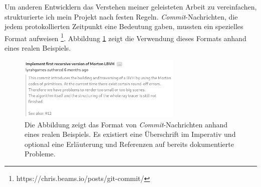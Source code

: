 \documentclass[crop=false]{standalone}
\begin{document}
    Um anderen Entwicklern das Verstehen meiner geleisteten Arbeit zu vereinfachen, strukturierte ich mein Projekt nach festen Regeln.
    \textit{Commit}-Nachrichten, die jedem protokollierten Zeitpunkt eine Bedeutung gaben, mussten ein spezielles Format aufweisen%
    \footnote{https://chris.beams.io/posts/git-commit/}.
    Abbildung \ref{fig:commit-message-example} zeigt die Verwendung dieses Formats anhand eines realen Beispiels.
    \begin{figure}[h]
      \center
      \includegraphics[width=0.7\textwidth]{images/commit_message_example.png}
      \caption{%
        Die Abbildung zeigt das Format von \textit{Commit}-Nachrichten anhand eines realen Beispiels.
        Es existiert eine Überschrift im Imperativ und optional eine Erläuterung und Referenzen auf bereits dokumentierte Probleme.
      }
      \label{fig:commit-message-example}
    \end{figure}
\end{document}
